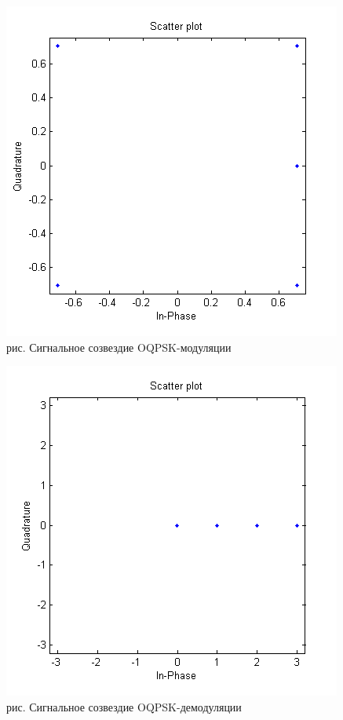 \documentclass[10pt,a4paper]{report}
\begin{document}
\begin{figure}
\begin{center}
\includegraphics[angle=0, scale = 0.8]{9_5}\newline
рис.  Сигнальное созвездие OQPSK-модуляции\newline
\end{center}
\end{figure}
\begin{figure}
\begin{center}
\includegraphics[angle=0, scale = 0.8]{9_6}\newline
рис.  Сигнальное созвездие OQPSK-демодуляции\newline
\end{center}
\end{figure}
\end{document}
